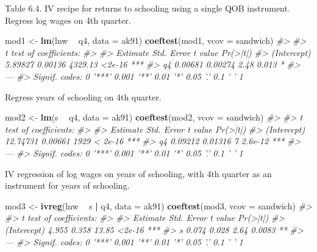 \documentclass[]{book}
\newenvironment{Shaded}{\begin{snugshade}}{\end{snugshade}}
\newcommand{\KeywordTok}[1]{\textcolor[rgb]{0.13,0.29,0.53}{\textbf{#1}}}
\newcommand{\DataTypeTok}[1]{\textcolor[rgb]{0.13,0.29,0.53}{#1}}
\newcommand{\StringTok}[1]{\textcolor[rgb]{0.31,0.60,0.02}{#1}}
\newcommand{\CommentTok}[1]{\textcolor[rgb]{0.56,0.35,0.01}{\textit{#1}}}
\newcommand{\OperatorTok}[1]{\textcolor[rgb]{0.81,0.36,0.00}{\textbf{#1}}}
\newcommand{\NormalTok}[1]{#1}
\theoremstyle{definition}
\theoremstyle{definition}
\theoremstyle{definition}
\theoremstyle{remark}
\begin{document}
Table 6.4. IV recipe for returns to schooling using a single QOB
instrument. Regress log wages on 4th quarter.

\begin{Shaded}
\begin{Highlighting}[]
\NormalTok{mod1 <-}\StringTok{ }\KeywordTok{lm}\NormalTok{(lnw }\OperatorTok{~}\StringTok{ }\NormalTok{q4, }\DataTypeTok{data =}\NormalTok{ ak91)}
\KeywordTok{coeftest}\NormalTok{(mod1, }\DataTypeTok{vcov =}\NormalTok{ sandwich)}
\CommentTok{#> }
\CommentTok{#> t test of coefficients:}
\CommentTok{#> }
\CommentTok{#>             Estimate Std. Error t value Pr(>|t|)    }
\CommentTok{#> (Intercept)  5.89827    0.00136 4329.13   <2e-16 ***}
\CommentTok{#> q4           0.00681    0.00274    2.48    0.013 *  }
\CommentTok{#> ---}
\CommentTok{#> Signif. codes:  0 '***' 0.001 '**' 0.01 '*' 0.05 '.' 0.1 ' ' 1}
\end{Highlighting}
\end{Shaded}

Regress years of schooling on 4th quarter.

\begin{Shaded}
\begin{Highlighting}[]
\NormalTok{mod2 <-}\StringTok{ }\KeywordTok{lm}\NormalTok{(s }\OperatorTok{~}\StringTok{ }\NormalTok{q4, }\DataTypeTok{data =}\NormalTok{ ak91)}
\KeywordTok{coeftest}\NormalTok{(mod2, }\DataTypeTok{vcov =}\NormalTok{ sandwich)}
\CommentTok{#> }
\CommentTok{#> t test of coefficients:}
\CommentTok{#> }
\CommentTok{#>             Estimate Std. Error t value Pr(>|t|)    }
\CommentTok{#> (Intercept) 12.74731    0.00661    1929  < 2e-16 ***}
\CommentTok{#> q4           0.09212    0.01316       7  2.6e-12 ***}
\CommentTok{#> ---}
\CommentTok{#> Signif. codes:  0 '***' 0.001 '**' 0.01 '*' 0.05 '.' 0.1 ' ' 1}
\end{Highlighting}
\end{Shaded}

IV regression of log wages on years of schooling, with 4th quarter as an
instrument for years of schooling.

\begin{Shaded}
\begin{Highlighting}[]
\NormalTok{mod3 <-}\StringTok{ }\KeywordTok{ivreg}\NormalTok{(lnw }\OperatorTok{~}\StringTok{ }\NormalTok{s }\OperatorTok{|}\StringTok{ }\NormalTok{q4, }\DataTypeTok{data =}\NormalTok{ ak91)}
\KeywordTok{coeftest}\NormalTok{(mod3, }\DataTypeTok{vcov =}\NormalTok{ sandwich)}
\CommentTok{#> }
\CommentTok{#> t test of coefficients:}
\CommentTok{#> }
\CommentTok{#>             Estimate Std. Error t value Pr(>|t|)    }
\CommentTok{#> (Intercept)    4.955      0.358   13.85   <2e-16 ***}
\CommentTok{#> s              0.074      0.028    2.64   0.0083 ** }
\CommentTok{#> ---}
\CommentTok{#> Signif. codes:  0 '***' 0.001 '**' 0.01 '*' 0.05 '.' 0.1 ' ' 1}
\end{Highlighting}
\end{Shaded}
\end{document}
